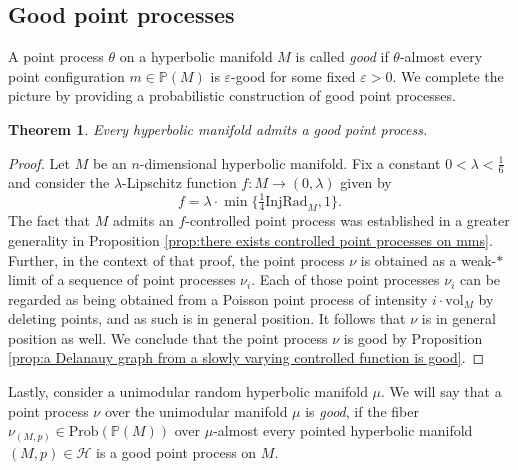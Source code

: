 \documentclass{amsart}
\newcommand{\Points}{\mathbb{P}}
\newcommand{\Hypers}{\mathcal{H}}
\newcommand{\vol}{\mathrm{vol}}
\theoremstyle{plain}
\newtheorem{theorem}{Theorem}[section]
\newtheorem{remark}[theorem]{Remark}
\numberwithin{equation}{section}
\theoremstyle{definition}
\begin{document}

\subsection{Good point processes}

A point process $\theta$ on a hyperbolic manifold $M$ is called \emph{good} if $\theta$-almost every point configuration $m \in \Points(M)$ is $\varepsilon$-good for some fixed $\varepsilon > 0$.
We complete the picture by providing a probabilistic  construction of good point processes.

\begin{theorem}
\label{thm:exists good point process}
Every hyperbolic manifold admits a good point process.
\end{theorem}
\begin{proof}
Let $M$ be an $n$-dimensional hyperbolic manifold. Fix a constant $0 < \lambda < \frac{1}{6}$ 
and consider the
$\lambda$-Lipschitz function $f : M \to (0,\lambda)$ given by
$$
f = \lambda \cdot \min\{\tfrac{1}{4} \mathrm{InjRad}_M,1\}.
$$
The fact that $M$ admits an $f$-controlled point process was  established in a greater generality in Proposition \ref{prop:there exists controlled point processes on mms}. Further, in the context of that proof, the point process $\nu$ is obtained as a weak-$*$ limit of a sequence of point processes $\nu_i$. Each of those point processes $\nu_i$ can be regarded as being obtained from a Poisson point process of intensity $i\cdot \vol_M$ by deleting points, and as such is in general position. It follows that $\nu$ is in general position as well.
We conclude that the point process $\nu$ is good by Proposition \ref{prop:a Delanauy graph from a slowly varying controlled function is good}.
\end{proof}

Lastly, consider a unimodular random hyperbolic manifold $\mu$. We will say that a point process $\nu$ over the unimodular manifold $\mu$ is \emph{good}, if the fiber $\nu_{(M,p)} \in \mathrm{Prob}(\Points(M))$ over $\mu$-almost every pointed hyperbolic manifold $(M,p)\in\Hypers$ is a good point process on $M$.
\end{document}
